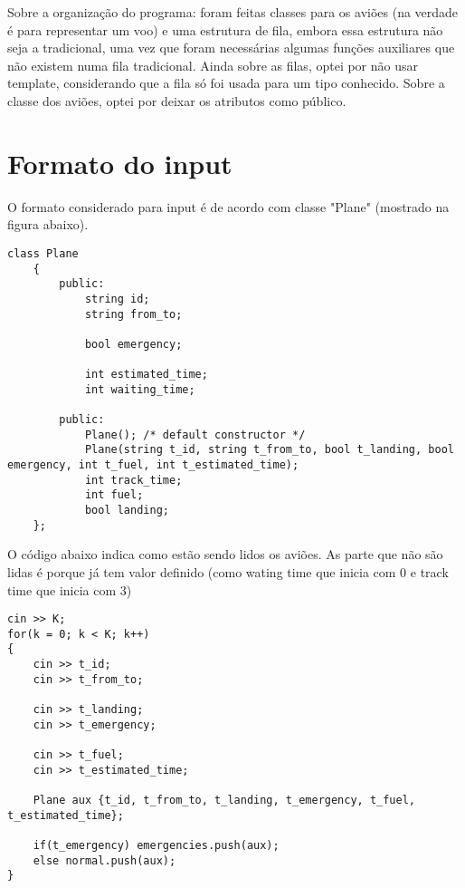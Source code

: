 \documentclass[a4paper,11pt]{article}
\theoremstyle{mytheor}
\begin{document}
Sobre a organização do programa: foram feitas classes para os aviões (na verdade é para representar um voo) e uma estrutura de fila, embora essa estrutura não seja a tradicional, uma vez que foram necessárias algumas funções auxiliares que não existem numa fila tradicional. Ainda sobre as filas, optei por não usar template, considerando que a fila só foi usada para um tipo conhecido. Sobre a classe dos aviões, optei por deixar os atributos como público. \newline

\section*{Formato do input}

O formato considerado para input é de acordo com classe "Plane" (mostrado na figura abaixo).\newline

\begin{lstlisting}[label={list:first},caption= Parte do código em plane.h.]
    class Plane
    {
        public:
            string id;
            string from_to;
    
            bool emergency;
    
            int estimated_time;
            int waiting_time;
    
        public:
            Plane(); /* default constructor */
            Plane(string t_id, string t_from_to, bool t_landing, bool emergency, int t_fuel, int t_estimated_time);
            int track_time;
            int fuel;
            bool landing;
    };
\end{lstlisting}


O código abaixo indica como estão sendo lidos os aviões. As parte que não são lidas é porque já tem valor definido (como wating time que inicia com 0 e track time que inicia com 3) \newline


\begin{lstlisting}[label={list:first},caption= Parte do código em airport.cpp que lê os aviões (C++).]
cin >> K;
for(k = 0; k < K; k++)
{
    cin >> t_id;
    cin >> t_from_to;

    cin >> t_landing;
    cin >> t_emergency;

    cin >> t_fuel;
    cin >> t_estimated_time;

    Plane aux {t_id, t_from_to, t_landing, t_emergency, t_fuel, t_estimated_time};
        
    if(t_emergency) emergencies.push(aux);
    else normal.push(aux);
}
\end{lstlisting}
\end{document}
